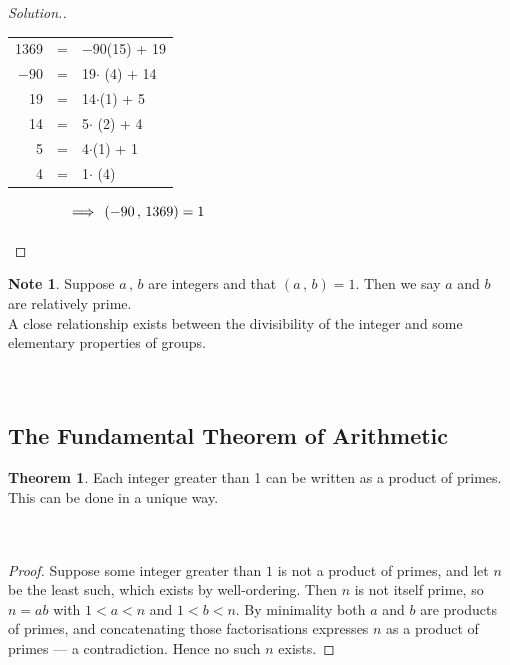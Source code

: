 \documentclass[11pt,a4paper]{article}
\theoremstyle{definition}
\newtheorem{thm}{Theorem}[subsection]
\newtheorem*{note}{Note}
\newenvironment{solution}
  {\renewcommand{\qedsymbol}{}\begin{proof}[\textit{Solution}.]}
  {\end{proof}}
\begin{document}
\begin{solution}
\begin{table}[H]
\begin{tabular}{rcl}
1369 & = & $-90$(15) + 19\\
$-90$& = & 19$\cdot$ (4) + 14\\
19 & = & 14$\cdot$(1) + 5\\
14 & = & 5$\cdot$ (2) + 4\\
5 & = & 4$\cdot$(1) + 1\\
4 & = & 1$\cdot$ (4)
\end{tabular}
$\hspace{1.5cm} \implies \, (-90\, , \, 1369) = 1$\\\\
\end{table}
\end{solution}




\begin{note}
Suppose $a\, , \, b$ are integers and that $(a\, , \, b) = 1$. Then we say $a$ and $b$ are relatively prime.\\
A close relationship exists between the divisibility of the integer and some elementary properties of groups.\\\\\\
\end{note}







\subsection{The Fundamental Theorem of Arithmetic}



\begin{thm}
Each integer greater than 1 can be written as a product of primes. This can be done in a unique way.\\\\\
\end{thm}

\begin{proof}
Suppose some integer greater than $1$ is not a product of primes, and let $n$ be
the least such, which exists by well-ordering. Then $n$ is not itself prime, so
$n = ab$ with $1<a<n$ and $1<b<n$. By minimality both $a$ and $b$ are products
of primes, and concatenating those factorisations expresses $n$ as a product of
primes --- a contradiction. Hence no such $n$ exists.
\end{proof}
\end{document}
